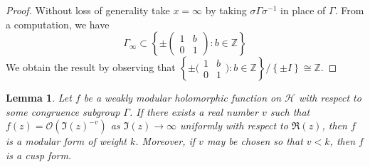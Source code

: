 \documentclass[10pt,leqno,twoside]{article}
\theoremstyle{plain}
\newtheorem{lemma}[lem]{Lemma}
\theoremstyle{definition}
\numberwithin{equation}{section}
\numberwithin{lem}{section}
\newcommand{\cbr}[1]{\left\{#1\right\}}
\begin{document}
\begin{proof}
    Without loss of generality take $x = \infty$ by taking $\sigma\varGamma\sigma^{-1}$ in place of $\varGamma$. From a computation, we have
    \[\varGamma_\infty \subset \cbr{\pm\begin{pmatrix}
        1 & b \\ 0 & 1
    \end{pmatrix} : b\in\mathbb Z}\]
We obtain the result by observing that $\cbr{\pm\big(\!\begin{smallmatrix}
    1 & b \\ 0 & 1
\end{smallmatrix}\!\big) : b\in\mathbb Z}/\cbr{\pm I}\cong \mathbb Z$.
\end{proof}
\begin{lemma}\label{lem: bound growth fourier coeffs}
    Let $f$ be a weakly modular holomorphic function on $\mathcal H$ with respect to some congruence subgroup $\varGamma$. If there exists a real number $v$ such that $f(z) = \mathcal O(\Im(z)^{-v})$ as $\Im(z)\to\infty$ uniformly with respect to $\Re(z)$, then $f$ is a modular form of weight $k$. Moreover, if $v$ may be chosen so that $v<k$, then $f$ is a cusp form.
\end{lemma}
\end{document}
